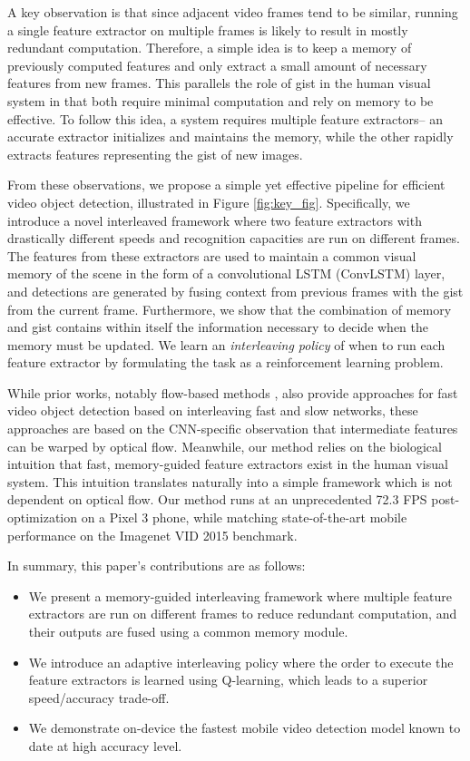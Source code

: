 \documentclass[10pt,twocolumn,letterpaper]{article}
\begin{document}
A key observation is that since adjacent video frames tend to be similar, running a single feature extractor on multiple frames is likely to result in mostly redundant computation. Therefore, a simple idea is to keep a memory of previously computed features and only extract a small amount of necessary features from new frames. This parallels the role of gist in the human visual system in that both require minimal computation and rely on memory to be effective. To follow this idea, a system requires multiple feature extractors-- an accurate extractor initializes and maintains the memory, while the other rapidly extracts features representing the gist of new images.

From these observations, we propose a simple yet effective pipeline for efficient video object detection, illustrated in Figure \ref{fig:key_fig}. Specifically, we introduce a novel interleaved framework where two feature extractors with drastically different speeds and recognition capacities are run on different frames. The features from these extractors are used to maintain a common visual memory of the scene in the form of a convolutional LSTM (ConvLSTM) layer, and detections are generated by fusing context from previous frames with the gist from the current frame. Furthermore, we show that the combination of memory and gist contains within itself the information necessary to decide when the memory must be updated. We learn an \textit{interleaving policy} of when to run each feature extractor by formulating the task as a reinforcement learning problem.

While prior works, notably flow-based methods \cite{ZhuX1, zhu2018towardsmobile}, also provide approaches for fast video object detection based on interleaving fast and slow networks, these approaches are based on the CNN-specific observation that intermediate features can be warped by optical flow. Meanwhile, our method relies on the biological intuition that fast, memory-guided feature extractors exist in the human visual system. This intuition translates naturally into a simple framework which is not dependent on optical flow. Our method runs at an unprecedented 72.3 FPS post-optimization on a Pixel 3 phone, while matching state-of-the-art mobile performance on the Imagenet VID 2015 benchmark. 


In summary, this paper's contributions are as follows:
\begin{itemize}
  \itemsep0em
\item We present a memory-guided interleaving framework where multiple feature extractors are run on different frames to reduce redundant computation, and their outputs are fused using a common memory module.
  \item We introduce an adaptive interleaving policy where the order to execute the feature extractors is learned using Q-learning, which leads to a superior speed/accuracy trade-off.
  \item We demonstrate on-device the fastest mobile video detection model known to date at high accuracy level.
\end{itemize}
\end{document}
